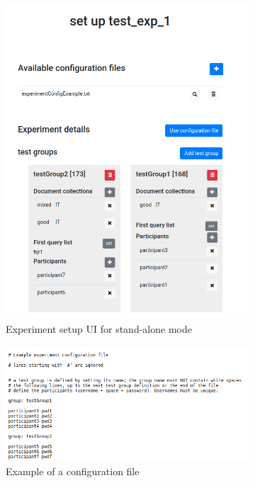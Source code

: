 \documentclass[fleqn]{article}
\begin{document}
\begin{figure} [ht]
     \centering
     \hfill
     \begin{subfigure}{0.32\textwidth}
         \centering
         \includegraphics[width=\textwidth]{img/expSetup1}
         \caption{Experiment setup UI for stand-alone mode}
         \label{fig:expSetupUi1}
     \end{subfigure}
     \hfill
     \begin{subfigure}{0.5\textwidth}
         \centering
         \includegraphics[width=\textwidth]{img/expConfigFile}
         \caption{Example of a configuration file}
         \label{fig:expConfigFile}
     \end{subfigure}
     \hfill
     \caption{}
     \label{fig:expConfigUi1}
\end{figure}
\end{document}
